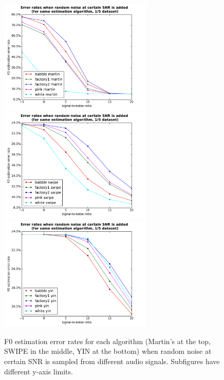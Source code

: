 \documentclass[11pt,a4paper]{report}
\begin{document}
\begin{figure}[htbp]
  \centering
  \includegraphics[width=0.65\textwidth]{error_rates_random_noise_wrt_snr_martin.pdf}
  \includegraphics[width=0.65\textwidth]{error_rates_random_noise_wrt_snr_swipe.pdf}
  \includegraphics[width=0.65\textwidth]{error_rates_random_noise_wrt_snr_yin.pdf}
  \caption[F0 estimation error rates for each algorithm when random noise at certain SNR is sampled from different audio signals.]{F0 estimation error rates for each algorithm (Martin's at the top, SWIPE in the middle, YIN at the bottom) when random noise at certain SNR is sampled from different audio signals.
    Subfigures have different y-axis limits.}
  \label{fig:random-noise-snr-same-algorithm}
\end{figure}
\end{document}
